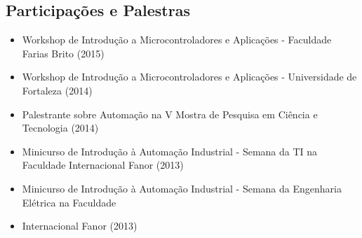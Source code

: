 \documentclass[11pt,a4paper,sans]{moderncv}
\begin{document}
\begin{samepage}
	\section{Participações e Palestras}
	\begin{itemize}[itemsep=0cm, leftmargin=0.6cm, label={\textbullet}]
		\item Workshop de Introdução a Microcontroladores e Aplicações - Faculdade Farias Brito (2015)
		\item Workshop de Introdução a Microcontroladores e Aplicações - Universidade de Fortaleza (2014)
		\item Palestrante sobre Automação na V Mostra de Pesquisa em Ciência e Tecnologia (2014)
		\item Minicurso de Introdução à Automação Industrial - Semana da TI na Faculdade Internacional Fanor (2013)
		\item Minicurso de Introdução à Automação Industrial - Semana da Engenharia Elétrica na Faculdade
		\item Internacional Fanor (2013)
	\end{itemize}
\end{samepage}
\vspace{\baselineskip}
\end{document}
